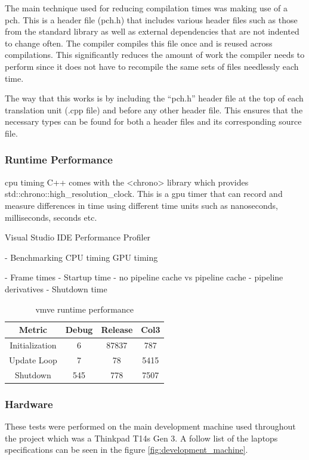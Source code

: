 \documentclass[11pt]{article}
\begin{document}
The main technique used for reducing compilation times was making use of a
\gls{pch}. This is a header file (pch.h) that includes various header files such
as those from the standard library as well as external dependencies that are not
indented to change often. The compiler compiles this file once and is reused
across compilations. This significantly reduces the amount of work the compiler
needs to perform since it does not have to recompile the same sets of files
needlessly each time.

The way that this works is by including the ``pch.h'' header file at the top of
each translation unit (.cpp file) and before any other header file. This ensures
that the necessary types can be found for both a header files and its
corresponding source file.

\subsubsection{Runtime Performance}

\gls{cpu} timing C++ comes with the <chrono> library which provides
std::chrono::high\_resolution\_clock. This is a \gls{gpu} timer that
can record and measure differences in time using different
time units such as nanoseconds, milliseconds, seconds etc.

Visual Studio IDE Performance
Profiler

- Benchmarking
    CPU timing
    GPU timing


- Frame times
- Startup time
	- no pipeline cache vs pipeline cache
	- pipeline derivatives
- Shutdown time


\begin{table}[h!]
\centering
\begin{tabular}{||c c c c||} 
  \hline
  Metric & Debug & Release & Col3 \\ [0.5ex] 
  \hline\hline
  Initialization & 6 & 87837 & 787 \\ 
  Update Loop & 7 & 78 & 5415 \\
  Shutdown & 545 & 778 & 7507 \\ [1ex] 
  \hline
\end{tabular}
\caption{\gls{vmve} runtime performance}
\label{fig:runtime_performance}
\end{table}

\subsubsection{Hardware}
These tests were performed on the main development machine used throughout the
project which was a Thinkpad T14s Gen 3. A follow list of the laptops specifications
can be seen in the figure \ref{fig:development_machine}.
\end{document}
